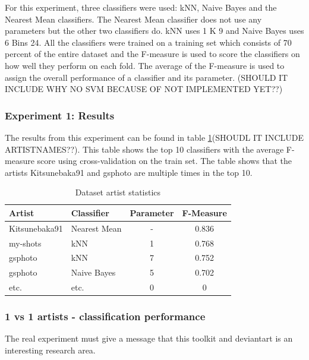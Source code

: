 For this experiment, three classifiers were used: kNN, Naive Bayes and the Nearest Mean classifiers.
The Nearest Mean classifier does not use any parameters but the other two classifiers do.
kNN uses 1 K 9 and Naive Bayes uses 6 Bins 24.
All the classifiers were trained on a training set which consists of 70 percent of the entire dataset and the F-measure is used to score the classifiers on how well they perform on each fold.
The average of the F-measure is used to assign the overall performance of a classifier and its parameter.
(SHOULD IT INCLUDE WHY NO SVM BECAUSE OF NOT IMPLEMENTED YET??)

\subsubsection{Experiment 1: Results}
The results from this experiment can be found in table \ref{ex1results}(SHOUDL IT INCLUDE ARTISTNAMES??). This table shows the top 10 classifiers with the average F-measure score using cross-validation on the train set. The table shows that the artists Kitsunebaka91 and gsphoto are multiple times in the top 10. 

\begin{table}
    \centering
    \begin{tabular}
        { | l | l | c | c } 
        \hline
        Artist & Classifier & Parameter & F-Measure \\
        \hline
        Kitsunebaka91 & Nearest Mean & - & 0.836  \\ 
        my-shots & kNN & 1 & 0.768 \\ 
        gsphoto & kNN & 7 & 0.752 \\ 
        gsphoto & Naive Bayes & 5 & 0.702 \\ 
        etc. & etc. & 0 & 0 \\
        \hline 
    \end{tabular}
    \caption{Dataset artist statistics}
    \label{ex1results}
\end{table}


\subsubsection{1 vs 1 artists - classification performance}
The real experiment must give a message that this toolkit and deviantart is an interesting research area.

